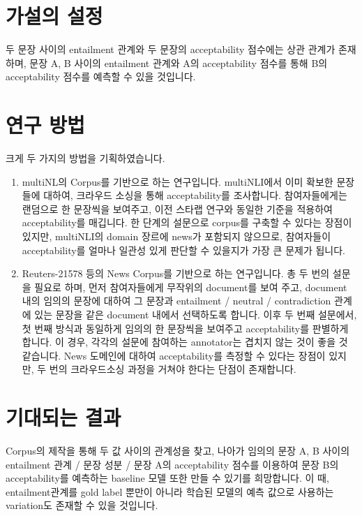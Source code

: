 \documentclass{article}
\begin{document}
\section{가설의 설정}
두 문장 사이의 entailment 관계와
두 문장의 acceptability 점수에는 상관 관계가 존재하며,
문장 A, B 사이의 entailment 관계와 A의 acceptability 점수를 통해
B의 acceptability 점수를 예측할 수 있을 것입니다.

\section{연구 방법}
크게 두 가지의 방법을 기획하였습니다.
\begin{enumerate}
  \item multiNL\cite{multinli}의 Corpus를 기반으로 하는 연구입니다.
  multiNLI에서 이미 확보한 문장들에 대하여,
  크라우드 소싱을 통해 acceptability를 조사합니다.
  참여자들에게는 랜덤으로 한 문장씩을 보여주고,
  이전 스타랩 연구\cite{credcorpus}와 동일한 기준을 적용하여 acceptability를 매깁니다.
  한 단계의 설문으로 corpus를 구축할 수 있다는 장점이 있지만,
  multiNLI의 domain 장르에 news가 포함되지 않으므로,
  참여자들이 acceptability를 얼마나 일관성 있게 판단할 수 있을지가 가장 큰 문제가 됩니다.

  \item Reuters-21578\cite{Reuters21578} 등의 News Corpus를 기반으로 하는 연구입니다.
  총 두 번의 설문을 필요로 하며,
  먼저 참여자들에게 무작위의 document를 보여 주고, document 내의 임의의 문장에 대하여
  그 문장과 entailment / neutral / contradiction 관계에 있는 문장을
  같은 document 내에서 선택하도록 합니다.
  이후 두 번째 설문에서, 첫 번째 방식과 동일하게
  임의의 한 문장씩을 보여주고 acceptability를 판별하게 합니다.
  이 경우, 각각의 설문에 참여하는 annotator는 겹치지 않는 것이 좋을 것 같습니다.
  News 도메인에 대하여 acceptability를 측정할 수 있다는 장점이 있지만,
  두 번의 크라우드소싱 과정을 거쳐야 한다는 단점이 존재합니다.
\end{enumerate}

\section{기대되는 결과}
Corpus의 제작을 통해 두 값 사이의 관계성을 찾고,
나아가 임의의 문장 A, B 사이의 entailment 관계 / 문장 성분 / 문장 A의 acceptability 점수를 이용하여
문장 B의 acceptability를 예측하는 baseline 모델 또한 만들 수 있기를 희망합니다.
이 때, entailment관계를 gold label 뿐만이 아니라
학습된 모델의 예측 값으로 사용하는 variation도 존재할 수 있을 것입니다.



\end{document}
